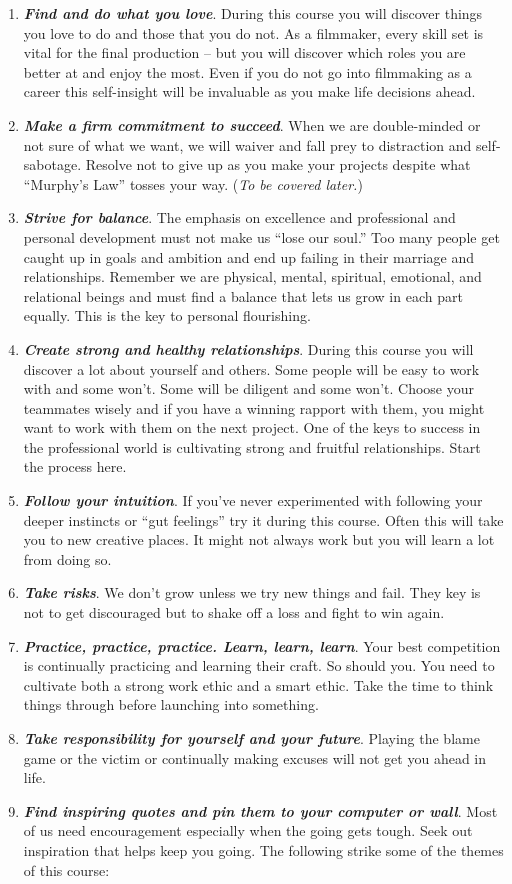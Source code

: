 \documentclass[
]{book}
\begin{document}
\begin{enumerate}
\item
  \textbf{\emph{Find and do what you love}}. During this course you will discover things you love to do and those that you do not. As a filmmaker, every skill set is vital for the final production -- but you will discover which roles you are better at and enjoy the most. Even if you do not go into filmmaking as a career this self-insight will be invaluable as you make life decisions ahead.
\item
  \textbf{\emph{Make a firm commitment to succeed}}. When we are double-minded or not sure of what we want, we will waiver and fall prey to distraction and self-sabotage. Resolve not to give up as you make your projects despite what ``Murphy's Law'' tosses your way. (\emph{To be covered later.})
\item
  \textbf{\emph{Strive for balance}}. The emphasis on excellence and professional and personal development must not make us ``lose our soul.'' Too many people get caught up in goals and ambition and end up failing in their marriage and relationships. Remember we are physical, mental, spiritual, emotional, and relational beings and must find a balance that lets us grow in each part equally. This is the key to personal flourishing.
\item
  \textbf{\emph{Create strong and healthy relationships}}. During this course you will discover a lot about yourself and others. Some people will be easy to work with and some won't. Some will be diligent and some won't. Choose your teammates wisely and if you have a winning rapport with them, you might want to work with them on the next project. One of the keys to success in the professional world is cultivating strong and fruitful relationships. Start the process here.
\item
  \textbf{\emph{Follow your intuition}}. If you've never experimented with following your deeper instincts or ``gut feelings'' try it during this course. Often this will take you to new creative places. It might not always work but you will learn a lot from doing so.
\item
  \textbf{\emph{Take risks}}. We don't grow unless we try new things and fail. They key is not to get discouraged but to shake off a loss and fight to win again.
\item
  \textbf{\emph{Practice, practice, practice. Learn, learn, learn}}. Your best competition is continually practicing and learning their craft. So should you. You need to cultivate both a strong work ethic and a smart ethic. Take the time to think things through before launching into something.
\item
  \textbf{\emph{Take responsibility for yourself and your future}}. Playing the blame game or the victim or continually making excuses will not get you ahead in life.
\item
  \textbf{\emph{Find inspiring quotes and pin them to your computer or wall}}. Most of us need encouragement especially when the going gets tough. Seek out inspiration that helps keep you going. The following strike some of the themes of this course:
\end{enumerate}
\end{document}
